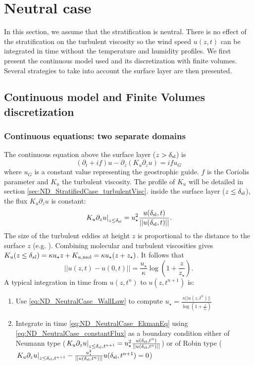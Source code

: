 \section{Neutral case}
In this section, we assume that the stratification is neutral.
There is no effect of the stratification on the turbulent viscosity
so the wind speed $u(z, t)$ can be integrated in time
without the temperature and humidity profiles.
We first present the continuous model used and its
discretization with finite volumes. Several strategies to
take into account the surface layer are then presented.
\subsection{Continuous model and Finite Volumes discretization}
\subsubsection{Continuous equations: two separate domains}
\label{sec:ND_NeutralCase}
The continuous equation above the surface layer
($z > \delta_{\rm sl}$) is
\begin{equation}
	\label{eq:ND_NeutralCase_EkmanEq}
  (\partial_t + if) u - \partial_z (K_u \partial_z u) = if u_G
\end{equation}
where $u_G$ is a constant value representing the geostrophic guide.
$f$ is the Coriolis parameter and $K_u$ the turbulent viscosity.
The profile of $K_u$ will be detailed
in section \ref{sec:ND_StratifiedCase_turbulentVisc}.
inside the surface layer ($z \leq \delta_{\rm sl}$), the flux
$K_u \partial_z u$ is constant:
\begin{equation}
	\label{eq:ND_NeutralCase_constantFlux}
	\left.K_u \partial_z u \right|_{z\leq \delta_{\rm sl}}
	= u_\star^2
	\frac{u(\delta_{\rm sl}, t)}{||u(\delta_{\rm sl}, t)||}.
\end{equation}
The size of the turbulent eddies at height $z$
is proportional to the distance to the surface $z$
(e.g. \cite{kawai2012wall}). Combining molecular and
turbulent viscosities gives 
$K_u(z\leq \delta_{sl}) = \kappa u_\star z + K_{u, {\rm mol}}
= \kappa u_\star (z + z_{\star})$.
It follows that
\begin{equation}
\label{eq:ND_NeutralCase_WallLaw}
	||u(z, t) - u(0, t)|| = \frac{{u_\star}}{\kappa}
	\log(1+\frac{z}{z_{\star}}).
\end{equation}
A typical integration in time from $u(z, t^{n})$ to
$u(z, t^{n+1})$ is:
\begin{enumerate}
  \item Use \eqref{eq:ND_NeutralCase_WallLaw} to compute 
	  $u_\star = \frac{\kappa ||u(z, t^n)||}
			{\log(1+\frac{z}{z_\star})}$
  \item Integrate in time \eqref{eq:ND_NeutralCase_EkmanEq}
  using \eqref{eq:ND_NeutralCase_constantFlux} as a boundary condition
		either of Neumann type ($\left.K_u \partial_z u
		\right|_{z\leq \delta_{\rm sl}, t^{n+1}}
	= u_\star^2 \frac{u(\delta_{\rm sl}, t^n)}
		{||u(\delta_{\rm sl}, t^n)||}$)
		or of Robin type ($\left.K_u \partial_z u
		\right|_{z\leq \delta_{\rm sl}, t^{n+1}}
		- \frac{u_\star^2} {||u(\delta_{\rm sl}, t^n)||}
		u(\delta_{\rm sl}, t^{n+1}) = 0$)
\end{enumerate}

